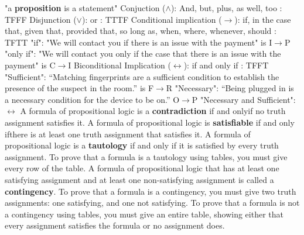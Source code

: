 \documentclass{article}
\begin{document}
\begin{tiny}
"a \textbf{proposition} is a statement"\newline
Conjuction ($\wedge$): And, but, plus, as well, too : TFFF\newline\newline
Disjunction ($\lor$): or : TTTF\newline\newline
Conditional implication ($\rightarrow$): if, in the case that, given that, provided that, so long as, when, where, whenever, should : TFTT\newline\newline
"if": "We will contact you if there is an issue with the payment" is I$\rightarrow$P\newline\newline
"only if": "We will contact you only if the case that there is an issue with the payment" is C$\rightarrow$I\newline\newline
Biconditional Implication ($\leftrightarrow$): if and only if : TFFT\newline\newline
"Sufficient": “Matching fingerprints are a sufficient condition to establish the presence of the suspect in the room.” is F$\rightarrow$R\newline\newline
"Necessary": “Being plugged in is a necessary condition for the device to be on.” O$\rightarrow$P\newline\newline
"Necessary and Sufficient": $\leftrightarrow$\newline\newline
A formula of propositional logic is a \textbf{contradiction} if and onlyif no truth assignment satisfies it.\newline
A formula of propositional logic is \textbf{satisfiable} if and only ifthere is at least one truth assignment that satisfies it.\newline
A formula of propositional logic is a \textbf{tautology} if and only if it is satisfied by every truth assignment. To prove that a formula is a tautology using tables, you must give every row of the table.\newline
A formula of propositional logic that has at least one satisfying assignment and at least one non-satisfying assignment is called a \textbf{contingency}. To prove that a formula is a contingency,  you  must  give two truth assignments: one satisfying, and one not satisfying. To prove that a formula is not a contingency using tables, you must give an entire table, showing either that every assignment satisfies the formula or no assignment does.\newline\newline


\end{tiny}
\end{document}
